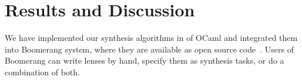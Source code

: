 \documentclass[12pt]{article}
\begin{document}
{\section{Results and Discussion}





We have implemented our synthesis algorithms in
of OCaml and integrated them into Boomerang system,
where they are available as open source code~\cite{GitHub}.
Users of Boomerang can write lenses by hand, specify them as
synthesis tasks, or do a combination of both.

}
\end{document}
